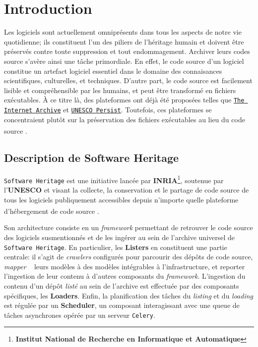 \documentclass[12pt,a4paper]{report}
\theoremstyle{definition}
\begin{document}
\setcounter{page}{1}
\chapter{Introduction}
Les logiciels sont actuellement omniprésents dans tous les aspects de notre vie quotidienne; ils constituent l'un des piliers de l'héritage humain et doivent être préservés contre toute suppression et tout endommagement. Archiver leurs codes source s'avère ainsi une tâche primordiale. En effet, le code source d’un logiciel constitue un artefact logiciel essentiel dans le domaine des connaisances scientifiques, culturelles, et techniques. D’autre part, le code source est facilement lisible et compréhensible par les humains, et peut être transformé en fichiers exécutables. À ce titre là, des plateformes ont déjà été proposées telles que \href{https://archive.org/}{\texttt{The Internet Archive}} et \href{https://unescopersist.org/}{\texttt{UNESCO Persist}}. Toutefois, ces plateformes se concentraient plutôt sur la préservation des fichiers exécutables au lieu du code source \textsuperscript{\citep{internetArchive}}\textsuperscript{\citep{unescoPersist}}.

\section{Description de Software Heritage}
\texttt{Software Heritage} est une initiative lancée par \textbf{INRIA}\textcolor{RoyalBlue}{\footnote{\textbf{Institut National de Recherche en Informatique et Automatique}}}, soutenue par l'\textbf{UNESCO} et visant \og la collecte, la conservation et le partage de code source de tous les logiciels publiquement accessibles depuis n'importe quelle plateforme d'hébergement de code source \fg \textsuperscript{\citep{dicosmoWhyAndHow}}.

Son architecture consiste en un \textit{framework} permettant de retrouver le code source des logiciels susmentionnés et de les ingérer au sein de l’archive universel de \texttt{Software Heritage}. En particulier, les \textbf{Listers} en constituent une partie centrale: il s’agit de \textit{crawlers} configurés pour parcourir des dépôts de code source, \og \textit{mapper} \fg~ leurs modèles à des modèles intégrables à l'infrastructure, et reporter l'ingestion de leur contenu à d’autres composants du \textit{framework}. L'ingestion du contenu d'un dépôt \og \textit{listé} \fg au sein de l'archive est effectuée par des composants spécifiques, les \textbf{Loaders}. Enfin, la planification des tâches du \textit{listing} et du \textit{loading} est régulée par un \textbf{Scheduler}, un composant interagissant avec une queue de tâches asynchrones opérée par un serveur \texttt{Celery}.
\end{document}
